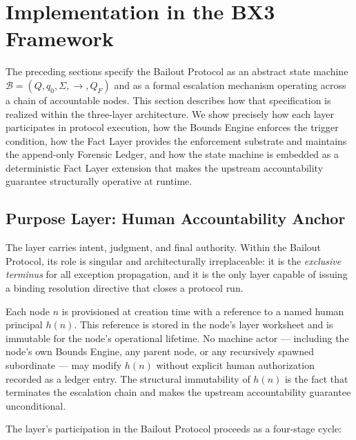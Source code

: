 \section{Implementation in the BX3 Framework}\label{sec:implementation}

The preceding sections specify the Bailout Protocol as an abstract state machine $\mathcal{B} = (Q, q_0, \Sigma, \rightarrow, Q_F)$ and as a formal escalation mechanism operating across a chain of accountable nodes. This section describes how that specification is realized within the \bxthree{} three-layer architecture. We show precisely how each layer participates in protocol execution, how the Bounds Engine enforces the trigger condition, how the Fact Layer provides the enforcement substrate and maintains the append-only Forensic Ledger, and how the state machine is embedded as a deterministic Fact Layer extension that makes the upstream accountability guarantee structurally operative at runtime.

\subsection{Purpose Layer: Human Accountability Anchor}\label{sec:purpose-layer}

The \purpose{} layer carries intent, judgment, and final authority. Within the Bailout Protocol, its role is singular and architecturally irreplaceable: it is the \emph{exclusive terminus} for all exception propagation, and it is the only layer capable of issuing a binding resolution directive that closes a protocol run.

Each \bxthree{} node $n$ is provisioned at creation time with a reference to a named human principal $h(n)$. This reference is stored in the node's \purpose{} layer worksheet and is immutable for the node's operational lifetime. No machine actor --- including the node's own Bounds Engine, any parent node, or any recursively spawned subordinate --- may modify $h(n)$ without explicit human authorization recorded as a ledger entry. The structural immutability of $h(n)$ is the fact that terminates the escalation chain and makes the upstream accountability guarantee unconditional.

The \purpose{} layer's participation in the Bailout Protocol proceeds as a four-stage cycle:

